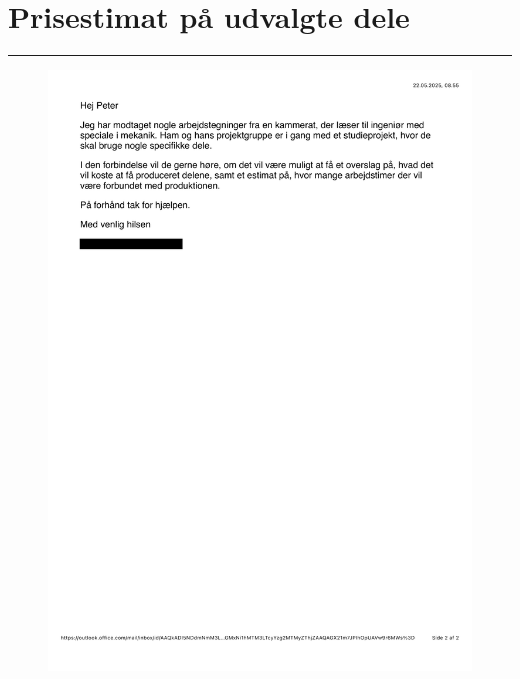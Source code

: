\chapter{Prisestimat på udvalgte dele} \label{Mail - prisestimat}
\plainbreak{-4}
\begin{figure} [H]
    \centering
    \includegraphics[width=0.9\linewidth]{bilag/Media/Media/Mail_2.png}
\end{figure}

\newpage

